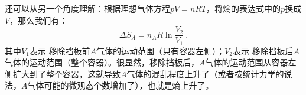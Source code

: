 还可以从另一个角度理解：根据理想气体方程$pV=nRT$，将熵的表达式中的$p$换成$V$，那么我们有：
$$
\Delta S_A = n_A R \ln \frac{V_2}{V_1}~.
$$
其中$V_1$表示 移除挡板前$A$气体的运动范围（只有容器左侧）；$V_2$表示 移除挡板后$A$气体的运动范围（整个容器）。很显然，移除挡板后，$A$气体的运动范围从容器左侧扩大到了整个容器，这就导致$A$气体的混乱程度上升了（或者按统计力学的说法，$A$气体可能的微观态个数增加了），也就是熵上升了。

